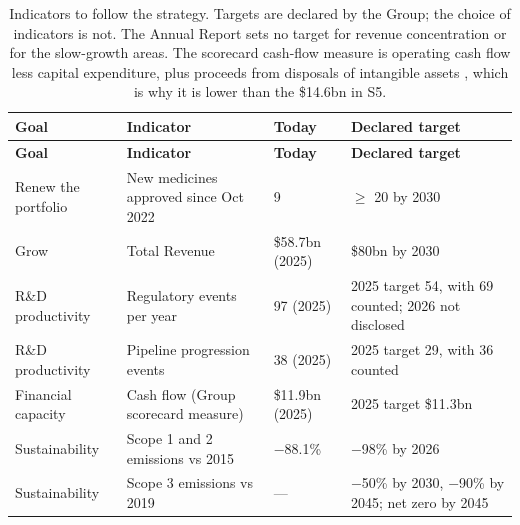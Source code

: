 \begin{xltabular}{\linewidth}{@{}N{2.5cm}Yp{2.2cm}Y@{}}
\caption{Indicators to follow the strategy. Targets are declared by the Group; the choice of indicators is not. The Annual Report sets no target for revenue concentration or for the slow-growth areas. The scorecard cash-flow measure is operating cash flow less capital expenditure, plus proceeds from disposals of intangible assets \cite[p.~91]{AR}, which is why it is lower than the \$14.6bn in S5.}\label{tab:indicadores}\\*
\toprule
\textbf{Goal} & \textbf{Indicator} & \textbf{Today} & \textbf{Declared target} \\*
\midrule
\endfirsthead
\toprule
\textbf{Goal} & \textbf{Indicator} & \textbf{Today} & \textbf{Declared target} \\*
\midrule
\endhead
\bottomrule
\endfoot
Renew the portfolio & New medicines approved since Oct 2022 & 9 & $\geq$ 20 by 2030 \cite[p.~10]{AR} \\
Grow & Total Revenue & \$58.7bn (2025) & \$80bn by 2030 \cite[p.~10]{AR} \\
R\&D productivity & Regulatory events per year & 97 (2025) & 2025 target 54, with 69 counted; 2026 not disclosed \cite[pp.~91, 102]{AR} \\
R\&D productivity & Pipeline progression events & 38 (2025) & 2025 target 29, with 36 counted \cite[pp.~11, 91]{AR} \\
Financial capacity & Cash flow (Group scorecard measure) & \$11.9bn (2025) & 2025 target \$11.3bn \cite[p.~91]{AR} \\
Sustainability & Scope 1 and 2 emissions vs 2015 & $-$88.1\% & $-$98\% by 2026 \cite[p.~42]{AR} \\
Sustainability & Scope 3 emissions vs 2019 & --- & $-$50\% by 2030, $-$90\% by 2045; net zero by 2045 \cite[p.~42]{AR} \\
\end{xltabular}
